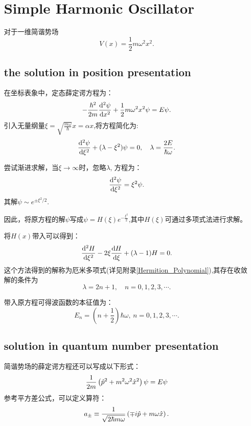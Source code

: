 \section{Simple Harmonic Oscillator}
对于一维简谐势场
\begin{equation}
    V(x)=\frac{1}{2}m\omega^2x^2.
\end{equation}
\subsection{the solution in position presentation}
在坐标表象中，定态薛定谔方程为：
\begin{equation}
    -\frac{\hbar^2}{2m}\frac{\mathrm{d}^2 \psi}{\mathrm{d} x^2}+\frac{1}{2}m\omega^2x^2\psi=E\psi.
\end{equation}
引入无量纲量$\xi=\sqrt{\frac{m\omega}{\hbar}}x=\alpha x$,将方程简化为:
\begin{equation}
    \frac{\mathrm{d}^2 \psi}{\mathrm{d} \xi^2}+(\lambda-\xi^2)\psi=0, \quad \lambda=\frac{2E}{\hbar\omega}.
\end{equation}

尝试渐进求解，当$\xi\to\infty$时，忽略$\lambda$, 方程为：
\begin{equation}
    \frac{\mathrm{d}^2 \psi}{\mathrm{d} \xi^2}=\xi^2\psi.
\end{equation}
其解$\psi\sim e^{\pm\xi^2/2}$.

因此，将原方程的解$\psi$写成$\psi=H(\xi)e^{-\frac{\xi^2}{2}}$,其中$H(\xi)$可通过多项式法进行求解。

将$H(x)$带入可以得到：
\begin{equation}
    \frac{\mathrm{d}^2 H}{\mathrm{d} \xi^2}-2\xi\frac{\mathrm{d} H}{\mathrm{d} \xi}+(\lambda-1)H=0.
\end{equation}
这个方法得到的解称为厄米多项式(详见附录\ref{Hermition_Polynomial}),其存在收敛解的条件为
\begin{equation}
    \lambda=2n+1, \quad n=0,1,2,3,\cdots.
\end{equation}

带入原方程可得波函数的本征值为：
\begin{equation}
    E_n=\left(n+\frac{1}{2}\right)\hbar\omega,\ n=0,1,2,3,\cdots. 
\end{equation}

\subsection{solution in quantum number presentation}

简谐势场的薛定谔方程还可以写成以下形式：
\begin{equation}
    \frac{1}{2m}\left(\hat{p}^2+m^2\omega^2\hat{x}^2\right)\psi=E\psi
\end{equation}
参考平方差公式，可以定义算符：
\begin{equation}
    a_{\pm}\equiv \frac{1}{\sqrt{2\hbar m\omega}}\left(\mp i\hat{p}+m\omega \hat{x}\right).
\end{equation}

